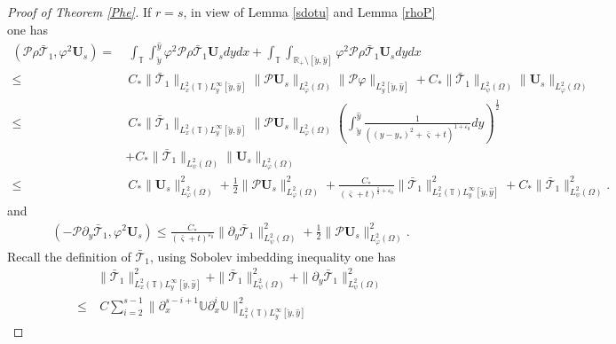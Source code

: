 \documentclass[10pt,a4paper]{amsart}
\begin{document}
\begin{proof}[Proof of Theorem \ref{Phe}]
If $r=s$, in view of Lemma \ref{sdotu} and Lemma \ref{rhoP} one has
\begin{align}\label{J6s1}
\left(\mathcal{P}\rho\bar{\mathcal{T}}_{1},\varphi^{2}\mathbf{U}_{s}\right)
=&~\int_{\mathbb{T}}\int_{\check{y}}^{\hat{y}}\varphi^{2}\mathcal{P}\rho\bar{\mathcal{T}}_{1}\mathbf{U}_{s}dydx
  +\int_{\mathbb{T}}\int_{\mathbb{R}_{+}\setminus[\check{y},\hat{y}]}\varphi^{2}\mathcal{P}\rho\bar{\mathcal{T}}_{1}\mathbf{U}_{s}dydx\\
\leq&~C_{*}\|\bar{\mathcal{T}}_{1}\|_{L^{2}_{x}(\mathbb{T})L^{\infty}_{y}[\check{y},\hat{y}]}
      \|\mathcal{P}\mathbf{U}_{s}\|_{L_{\varphi}^{2}(\Omega)}\|\mathcal{P}\varphi\|_{L_{y}^{2}[\check{y},\hat{y}]}
     +C_{*}\|\bar{\mathcal{T}}_{1}\|_{L_{\psi}^{2}(\Omega)}\|\mathbf{U}_{s}\|_{L_{\varphi}^{2}(\Omega)}\nonumber\\
\leq&~C_{*}\|\bar{\mathcal{T}}_{1}\|_{L^{2}_{x}(\mathbb{T})L^{\infty}_{y}[\check{y},\hat{y}]}
      \|\mathcal{P}\mathbf{U}_{s}\|_{L_{\varphi}^{2}(\Omega)}
      \left(\int_{\check{y}}^{\hat{y}}\frac{1}{((y-y_{*})^2+\bar{\varsigma}+t)^{1+\varepsilon_{0}}}dy\right)^{\frac{1}{2}}\nonumber\\
    &+C_{*}\|\bar{\mathcal{T}}_{1}\|_{L_{\psi}^{2}(\Omega)}\|\mathbf{U}_{s}\|_{L_{\varphi}^{2}(\Omega)}\nonumber\\
\leq&~C_{*}\|\mathbf{U}_{s}\|_{L_{\varphi}^{2}(\Omega)}^{2}
     +\frac{1}{2}\|\mathcal{P}\mathbf{U}_{s}\|_{L_{\varphi}^{2}(\Omega)}^{2}
     +\frac{C_{*}}{(\bar{\varsigma}+t)^{\frac{1}{2}+\varepsilon_{0}}}\|\bar{\mathcal{T}}_{1}\|_{L_{x}^{2}(\mathbb{T})L_{y}^{\infty}[\check{y},\hat{y}]}^{2}
     +C_{*}\|\bar{\mathcal{T}}_{1}\|_{L_{\psi}^{2}(\Omega)}^{2}.\nonumber
\end{align}
and
\begin{align}\label{J6s2}
\left(-\mathcal{P}\partial_{y}\bar{\mathcal{T}}_{1},\varphi^{2}\mathbf{U}_{s}\right)
\leq \frac{C_{*}}{(\bar{\varsigma}+t)^{\varepsilon_{0}}}\|\partial_{y}\bar{\mathcal{T}}_{1}\|_{L_{\psi}^{2}(\Omega)}^{2}
    +\frac{1}{2}\|\mathcal{P}\mathbf{U}_{s}\|_{L_{\varphi}^{2}(\Omega)}^{2}.
\end{align}
Recall the definition of $\bar{\mathcal{T}}_{1}$, using Sobolev imbedding inequality one has
\begin{align}\label{J6s3}
&\|\bar{\mathcal{T}}_{1}\|_{L_{x}^{2}(\mathbb{T})L_{y}^{\infty}[\check{y},\hat{y}]}^{2}
+\|\bar{\mathcal{T}}_{1}\|_{L_{\psi}^{2}(\Omega)}^{2}
+\|\partial_{y}\bar{\mathcal{T}}_{1}\|_{L_{\psi}^{2}(\Omega)}^{2}\\
\leq&~C\sum_{i=2}^{s-1}\|\partial_{x}^{s-i+1}\mathbb{U}\partial_{x}^{i}\mathbb{U}\|_{L_{x}^{2}(\mathbb{T})L_{y}^{\infty}[\check{y},\hat{y}]}^{2}

\end{align}
\end{proof}
\end{document}
